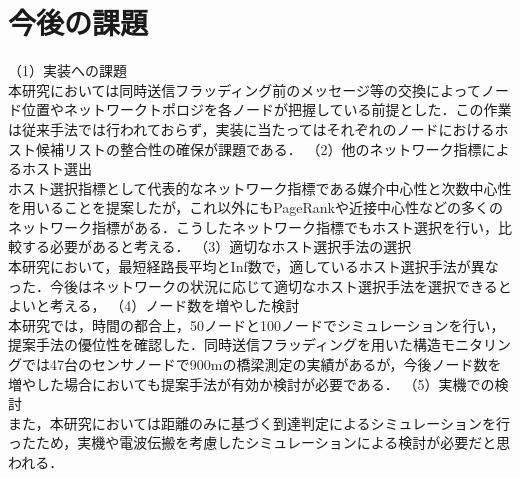 \section{今後の課題}

    （1）実装への課題\\
    本研究においては同時送信フラッディング前のメッセージ等の交換によってノード位置やネットワークトポロジを各ノードが把握している前提とした．この作業は従来手法では行われておらず，実装に当たってはそれぞれのノードにおけるホスト候補リストの整合性の確保が課題である．
    （2）他のネットワーク指標によるホスト選出\\
    ホスト選択指標として代表的なネットワーク指標である媒介中心性と次数中心性を用いることを提案したが，これ以外にもPageRankや近接中心性などの多くのネットワーク指標がある．こうしたネットワーク指標でもホスト選択を行い，比較する必要があると考える．
    （3）適切なホスト選択手法の選択\\
    本研究において，最短経路長平均とInf数で，適しているホスト選択手法が異なった．今後はネットワークの状況に応じて適切なホスト選択手法を選択できるとよいと考える，
    （4）ノード数を増やした検討\\
    本研究では，時間の都合上，50ノードと100ノードでシミュレーションを行い，提案手法の優位性を確認した．同時送信フラッディングを用いた構造モニタリングでは47台のセンサノードで900\si{\meter}の橋梁測定の実績があるが，今後ノード数を増やした場合においても提案手法が有効か検討が必要である．
    （5）実機での検討\\
    また，本研究においては距離のみに基づく到達判定によるシミュレーションを行ったため，実機や電波伝搬を考慮したシミュレーションによる検討が必要だと思われる．




